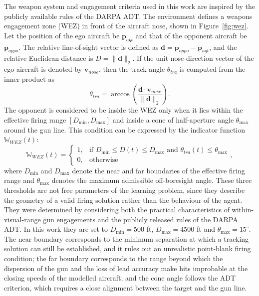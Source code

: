\documentclass[pdflatex,sn-mathphys-num]{sn-jnl}%
\theoremstyle{thmstyleone}%
\theoremstyle{thmstyletwo}%
\theoremstyle{thmstylethree}%
\begin{document}
The weapon system and engagement criteria used in this work are inspired by the publicly available rules of the DARPA ADT. The environment defines a weapons engagement zone (WEZ) in front of the aircraft nose, shown in Figure~\ref{fig:wez}. Let the position of the ego aircraft be $\mathbf{p}_{agt}$ and that of the opponent aircraft be $\mathbf{p}_{oppo}$. The relative line-of-sight vector is defined as $\mathbf{d} = \mathbf{p}_{oppo} - \mathbf{p}_{agt}$, and the relative Euclidean distance is $D = \|\mathbf{d}\|_2$. If the unit nose-direction vector of the ego aircraft is denoted by $\mathbf{v}_{nose}$, then the track angle $\theta_{tra}$ is computed from the inner product as
\begin{equation}
    \theta_{tra} = \arccos \left( \frac{\mathbf{d} \cdot \mathbf{v}_{nose}}{\|\mathbf{d}\|_2} \right).
    \label{eq:tra}
\end{equation}
The opponent is considered to be inside the WEZ only when it lies within the effective firing range $[D_{\min}, D_{\max}]$ and inside a cone of half-aperture angle $\theta_{\max}$ around the gun line. This condition can be expressed by the indicator function $\mathbb{W}_{WEZ}(t)$:
\begin{equation}
    \mathbb{W}_{WEZ}(t) = 
    \begin{cases} 
        1, & \text{if } D_{\min} \le D(t) \le D_{\max} \text{ and } \theta_{tra}(t) \le \theta_{\max} \\ 
        0, & \text{otherwise} 
    \end{cases},
    \label{eq:wez}
\end{equation}
where $D_{\min}$ and $D_{\max}$ denote the near and far boundaries of the effective firing range and $\theta_{\max}$ denotes the maximum admissible off-boresight angle. These three thresholds are not free parameters of the learning problem, since they describe the geometry of a valid firing solution rather than the behaviour of the agent. They were determined by considering both the practical characteristics of within-visual-range gun engagements and the publicly released rules of the DARPA ADT. In this work they are set to $D_{\min} = 500$ ft, $D_{\max} = 4500$ ft and $\theta_{\max} = 15^\circ$. The near boundary corresponds to the minimum separation at which a tracking solution can still be established, and it rules out an unrealistic point-blank firing condition; the far boundary corresponds to the range beyond which the dispersion of the gun and the loss of lead accuracy make hits improbable at the closing speeds of the modelled aircraft; and the cone angle follows the ADT criterion, which requires a close alignment between the target and the gun line.
\end{document}
